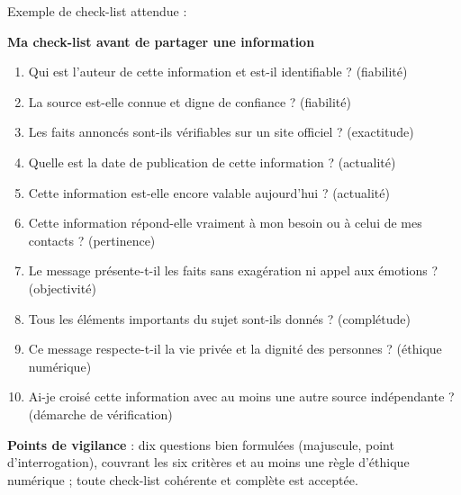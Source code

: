\documentclass[11pt]{article}
\newcommand{\cle}[1]{{\popxbold\color{popdark}#1}}
\begin{document}
\begin{corrige}
Exemple de check-list attendue :

\textbf{Ma check-list avant de partager une information}
\begin{enumerate}
\item Qui est l'auteur de cette information et est-il identifiable ? (\cle{fiabilité})
\item La source est-elle connue et digne de confiance ? (\cle{fiabilité})
\item Les faits annoncés sont-ils vérifiables sur un site officiel ? (\cle{exactitude})
\item Quelle est la date de publication de cette information ? (\cle{actualité})
\item Cette information est-elle encore valable aujourd'hui ? (\cle{actualité})
\item Cette information répond-elle vraiment à mon besoin ou à celui de mes contacts ? (\cle{pertinence})
\item Le message présente-t-il les faits sans exagération ni appel aux émotions ? (\cle{objectivité})
\item Tous les éléments importants du sujet sont-ils donnés ? (\cle{complétude})
\item Ce message respecte-t-il la vie privée et la dignité des personnes ? (\cle{éthique numérique})
\item Ai-je croisé cette information avec au moins une autre source indépendante ? (démarche de vérification)
\end{enumerate}
\textbf{Points de vigilance} : dix questions bien formulées (majuscule, point d'interrogation), couvrant les six critères et au moins une règle d'éthique numérique ; toute check-list cohérente et complète est acceptée.
\end{corrige}
\end{document}
